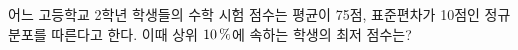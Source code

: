 어느 고등학교 2학년 학생들의 수학 시험 점수는 평균이 75점, 표준편차가 10점인 정규분포를 따른다고 한다. 이때 상위 $10\mkern3mu \%$에 속하는 학생의 최저 점수는? 
